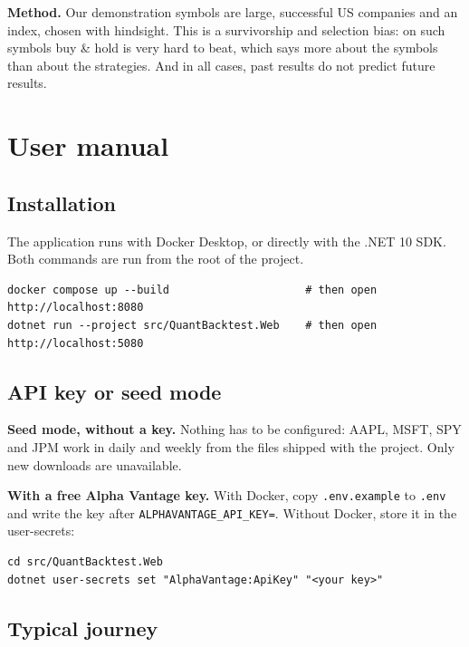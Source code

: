 \documentclass[11pt,a4paper]{article}
\newcommand{\code}[1]{\texttt{\small #1}}
\begin{document}
\textbf{Method.} Our demonstration symbols are large, successful US companies and an index, chosen with hindsight. This is a survivorship and selection bias: on such symbols buy \& hold is very hard to beat, which says more about the symbols than about the strategies. And in all cases, past results do not predict future results.

\clearpage
\appendix

\section{User manual}
\label{app:manual}

\subsection*{Installation}

The application runs with Docker Desktop, or directly with the .NET 10 SDK. Both commands are run from the root of the project.

\begin{lstlisting}
docker compose up --build                     # then open http://localhost:8080
dotnet run --project src/QuantBacktest.Web    # then open http://localhost:5080
\end{lstlisting}

\subsection*{API key or seed mode}

\textbf{Seed mode, without a key.} Nothing has to be configured: AAPL, MSFT, SPY and JPM work in daily and weekly from the files shipped with the project. Only new downloads are unavailable.

\textbf{With a free Alpha Vantage key.} With Docker, copy \code{.env.example} to \code{.env} and write the key after \code{ALPHAVANTAGE\_API\_KEY=}. Without Docker, store it in the user-secrets:

\begin{lstlisting}
cd src/QuantBacktest.Web
dotnet user-secrets set "AlphaVantage:ApiKey" "<your key>"
\end{lstlisting}

\subsection*{Typical journey}
\end{document}
